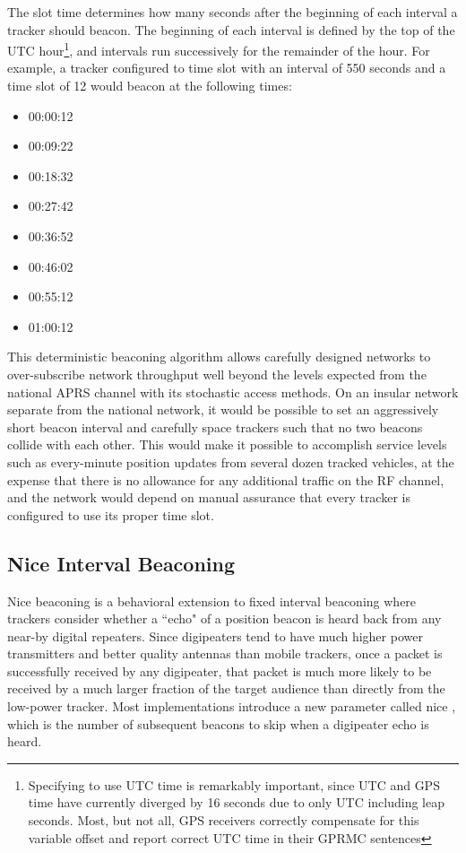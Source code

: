 The slot time determines how many seconds after the beginning of each interval
a tracker should beacon. The beginning of each interval is defined by the top of
the UTC hour\footnote{Specifying to use UTC time is remarkably 
	important, since UTC and GPS time have currently diverged by 16 seconds due to
	only UTC including leap seconds. Most, but not all, GPS receivers correctly
	compensate for this variable offset and report correct UTC time in their
GPRMC sentences}, and intervals run successively for the remainder of the hour.
For example, a tracker configured to time slot with an interval of 550 seconds and
a time slot of 12 would beacon at the following times:
\begin{itemize}
\item 00:00:12
\item 00:09:22
\item 00:18:32
\item 00:27:42
\item 00:36:52
\item 00:46:02
\item 00:55:12
\item 01:00:12
\end{itemize}

This deterministic beaconing algorithm allows carefully designed networks to 
over-subscribe network throughput well beyond the levels expected from 
the national APRS channel with its stochastic access methods. 
On an insular network separate from the national
network, it would be possible to set an aggressively short beacon interval and 
carefully space trackers such that no two beacons collide with each other. 
This would make it possible to accomplish service levels such as
every-minute position updates from several dozen tracked vehicles, 
at the expense that there is no allowance for any additional traffic 
on the RF channel, and the network would depend on manual 
assurance that every tracker is configured to use its proper time slot.

\subsection{Nice Interval Beaconing}

Nice beaconing is a behavioral extension to fixed interval beaconing 
where trackers consider whether a ``echo"
of a position beacon is heard back from any near-by digital repeaters.
Since digipeaters tend to have much higher power transmitters and better quality
antennas than mobile trackers, once a packet is successfully received by any 
digipeater, that packet is much more likely to be received by a much larger
fraction of the target audience than directly from the low-power tracker. 
Most implementations introduce a new parameter
called nice \cite[p.~38]{ot3manual}, 
which is the number of subsequent beacons to skip when a digipeater echo is heard.

